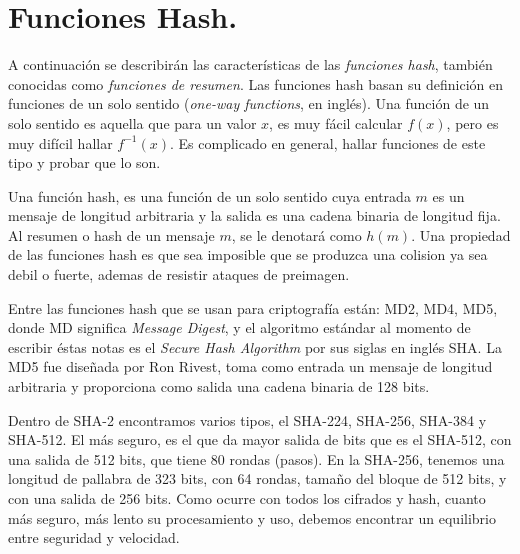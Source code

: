 \section{Funciones Hash. }
A continuación se describirán las características de las {\it funciones hash}, también conocidas como {\it funciones de resumen}. Las funciones hash basan su definición en funciones de un solo sentido  ({\it one-way functions}, en inglés). Una función de un solo sentido es aquella que para un valor $x$, es  muy fácil calcular $f(x)$, pero es muy difícil hallar $f^{-1}(x)$. Es complicado en general, hallar funciones de este tipo y probar que lo son.
\begin{definition}
Una función hash, es una función de un solo sentido cuya entrada $m$  es un mensaje de longitud arbitraria y la salida es una cadena binaria de longitud fija. Al resumen o hash de un mensaje $m$, se le denotará como $h(m)$. Una propiedad de las funciones hash es que sea imposible que se produzca una colision ya sea debil o fuerte, ademas de resistir ataques de preimagen.
\end{definition}
 
Entre las funciones hash que se usan para criptograf\'ia est\'an: MD2, MD4, MD5, donde MD significa {\it Message Digest}, y el algoritmo est\'andar al momento de escribir \'estas notas es el {\it Secure Hash Algorithm} por sus siglas en ingl\'es SHA.
  La MD5 fue dise\~nada por Ron Rivest, toma como entrada un mensaje de longitud arbitraria y proporciona como salida una cadena binaria de 128 bits.

Dentro de SHA-2 encontramos varios tipos, el SHA-224, SHA-256, SHA-384 y SHA-512. El más seguro, es el que da mayor salida de bits que es el SHA-512, con una salida de 512 bits, que tiene 80 rondas (pasos).
En la SHA-256, tenemos una longitud de pallabra de 323 bits, con 64 rondas, tamaño del bloque de 512 bits, y con una salida de 256 bits.
Como ocurre con todos los cifrados y hash, cuanto más seguro, más lento su procesamiento y uso, debemos encontrar un equilibrio entre seguridad y velocidad.


